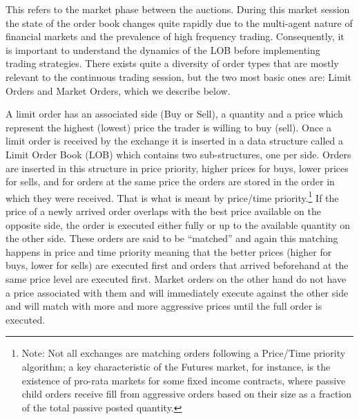 This refers to the market phase between the auctions. During this market session  the state of the order book changes quite rapidly due to the multi-agent nature of financial markets and the prevalence of high frequency trading. Consequently, it is important to understand the dynamics of the LOB before implementing trading strategies. There exists quite a diversity of order types that are mostly relevant to the continuous trading session, but the two most basic ones are: Limit Orders and Market Orders, which we describe below. \twomedskip


A limit order has an associated side (Buy or Sell), a quantity and a price which represent the highest (lowest) price the trader is willing to buy (sell). Once a limit order is received by the exchange it is inserted in a data structure called a Limit Order Book (LOB) which contains two sub-structures, one per side. Orders are inserted in this structure in price priority, higher prices for buys, lower prices for sells, and for orders at the same price the orders are stored in the order in which they were received. That is what is meant by price/time priority.\footnote{Note: Not all exchanges are matching orders following a Price/Time priority algorithm; a key characteristic of the Futures market, for instance, is the existence of pro-rata markets for some fixed income contracts, where passive child orders receive fill from aggressive orders based on their size as a fraction of the total passive posted quantity.} If the price of a newly arrived order overlaps with the best price available on the opposite side, the order is executed either fully or up to the available quantity on the other side. These orders are said to be ``matched'' and again this matching happens in price and time priority meaning that the better prices (higher for buys, lower for sells) are executed first and orders that arrived beforehand at the same price level are executed first. Market orders on the other hand do not have a price associated with them and will immediately execute against the other side and will match with more and more aggressive prices until the full order is executed. 


